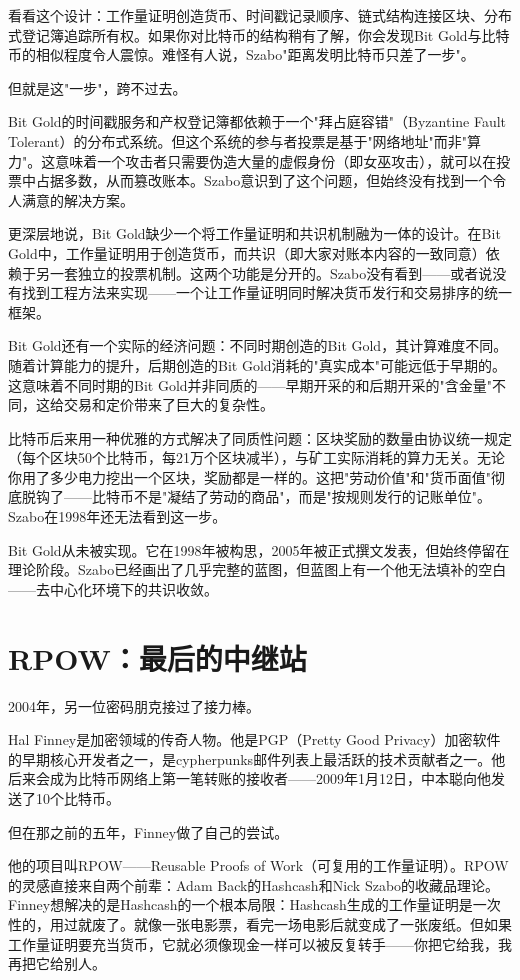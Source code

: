 \documentclass[a4paper,12pt,openany]{ctexbook}
\begin{document}
看看这个设计：工作量证明创造货币、时间戳记录顺序、链式结构连接区块、分布式登记簿追踪所有权。如果你对比特币的结构稍有了解，你会发现Bit Gold与比特币的相似程度令人震惊。难怪有人说，Szabo"距离发明比特币只差了一步"。

但就是这"一步"，跨不过去。

Bit Gold的时间戳服务和产权登记簿都依赖于一个"拜占庭容错"（Byzantine Fault Tolerant）的分布式系统。但这个系统的参与者投票是基于"网络地址"而非"算力"。这意味着一个攻击者只需要伪造大量的虚假身份（即女巫攻击），就可以在投票中占据多数，从而篡改账本。Szabo意识到了这个问题，但始终没有找到一个令人满意的解决方案。

更深层地说，Bit Gold缺少一个将工作量证明和共识机制融为一体的设计。在Bit Gold中，工作量证明用于创造货币，而共识（即大家对账本内容的一致同意）依赖于另一套独立的投票机制。这两个功能是分开的。Szabo没有看到——或者说没有找到工程方法来实现——一个让工作量证明同时解决货币发行和交易排序的统一框架。

Bit Gold还有一个实际的经济问题：不同时期创造的Bit Gold，其计算难度不同。随着计算能力的提升，后期创造的Bit Gold消耗的"真实成本"可能远低于早期的。这意味着不同时期的Bit Gold并非同质的——早期开采的和后期开采的"含金量"不同，这给交易和定价带来了巨大的复杂性。

比特币后来用一种优雅的方式解决了同质性问题：区块奖励的数量由协议统一规定（每个区块50个比特币，每21万个区块减半），与矿工实际消耗的算力无关。无论你用了多少电力挖出一个区块，奖励都是一样的。这把"劳动价值"和"货币面值"彻底脱钩了——比特币不是"凝结了劳动的商品"，而是"按规则发行的记账单位"。Szabo在1998年还无法看到这一步。

Bit Gold从未被实现。它在1998年被构思，2005年被正式撰文发表，但始终停留在理论阶段。Szabo已经画出了几乎完整的蓝图，但蓝图上有一个他无法填补的空白——去中心化环境下的共识收敛。


\section*{RPOW：最后的中继站}


2004年，另一位密码朋克接过了接力棒。

Hal Finney是加密领域的传奇人物。他是PGP（Pretty Good Privacy）加密软件的早期核心开发者之一，是cypherpunks邮件列表上最活跃的技术贡献者之一。他后来会成为比特币网络上第一笔转账的接收者——2009年1月12日，中本聪向他发送了10个比特币。

但在那之前的五年，Finney做了自己的尝试。

他的项目叫RPOW——Reusable Proofs of Work（可复用的工作量证明）。RPOW的灵感直接来自两个前辈：Adam Back的Hashcash和Nick Szabo的收藏品理论。Finney想解决的是Hashcash的一个根本局限：Hashcash生成的工作量证明是一次性的，用过就废了。就像一张电影票，看完一场电影后就变成了一张废纸。但如果工作量证明要充当货币，它就必须像现金一样可以被反复转手——你把它给我，我再把它给别人。
\end{document}
